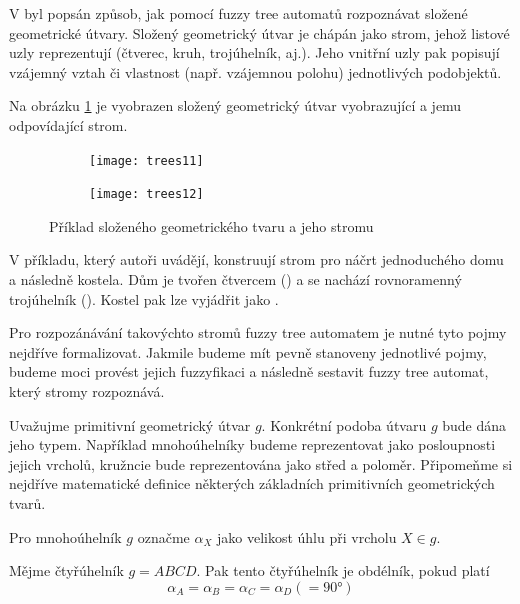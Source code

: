 \documentclass[a4paper,10pt]{article}
\begin{document}
V \cite{Lee-FuzTreAutSynPatRec} byl popsán způsob, jak pomocí fuzzy tree automatů rozpoznávat složené geometrické útvary. Složený geometrický útvar je chápán jako strom, jehož listové uzly reprezentují  (čtverec, kruh, trojúhelník, aj.). Jeho vnitřní uzly pak popisují vzájemný vztah či vlastnost (např. vzájemnou polohu) jednotlivých podobjektů.


\begin{example}
  Na obrázku \ref{img:Geoms} je vyobrazen složený geometrický útvar vyobrazující  a jemu odpovídající strom.
\end{example}

\begin{figure}[htp]
 \centering
 
 \begin{subfigure}{0.4\textwidth}
  \texttt{[image: trees11]}
 \end{subfigure}
 \begin{subfigure}{0.4\textwidth}
  \texttt{[image: trees12]}
 \end{subfigure}
 
 \caption{Příklad složeného geometrického tvaru a jeho stromu} \label{img:Geoms}
\end{figure}

V příkladu, který autoři uvádějí, konstruují strom pro náčrt jednoduchého domu a následně kostela. Dům je tvořen čtvercem () a  se nachází rovnoramenný trojúhelník (). Kostel pak lze vyjádřit jako .

Pro rozpozánávání takovýchto stromů fuzzy tree automatem je nutné tyto pojmy nejdříve formalizovat. Jakmile budeme mít pevně stanoveny jednotlivé pojmy, budeme moci provést jejich fuzzyfikaci a následně sestavit fuzzy tree automat, který stromy rozpoznává.

Uvažujme primitivní geometrický útvar $g$. Konkrétní podoba útvaru $g$ bude dána jeho typem. Například mnohoúhelníky budeme reprezentovat jako posloupnosti jejich vrcholů, kružncie bude reprezentována jako střed a poloměr. Připomeňme si nejdříve matematické definice některých základních primitivních geometrických tvarů. 

\begin{notation*}
 Pro mnohoúhelník $g$ označme $\alpha_X$ jako velikost úhlu při vrcholu $X \in g$.
\end{notation*}

\begin{definition}[Obdélník]
 Mějme čtyřúhelník $g = A B C D$. Pak tento čtyřúhelník je obdélník, pokud platí
 $$
  \alpha_A = \alpha_B = \alpha_C = \alpha_D ( = 90° )
 $$
\end{definition}
\end{document}
